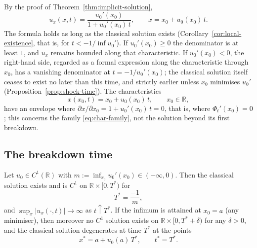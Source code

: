 By the proof of Theorem~\ref{thm:implicit-solution},
\begin{equation}
  \label{eq:ux-formula}
  u_x(x,t) = \frac{u_0'(x_0)}{1 + u_0'(x_0)\, t}, \qquad x = x_0 + u_0(x_0)\, t.
\end{equation}
The formula holds as long as the classical solution exists
(Corollary~\ref{cor:local-existence}, that is, for $t<-1/\inf u_0'$). If
$u_0'(x_0) \geq 0$ the denominator is at least $1$, and $u_x$ remains bounded
along that characteristic. If $u_0'(x_0) < 0$, the right-hand side, regarded as
a formal expression along the characteristic through $x_0$, has a vanishing
denominator at $t = -1/u_0'(x_0)$; the classical solution itself ceases to exist
no later than this time, and strictly earlier unless $x_0$ minimises $u_0'$
(Proposition~\ref{prop:shock-time}). The characteristics
\begin{equation}
  \label{eq:char-family}
  x(x_0, t) = x_0 + u_0(x_0)\, t, \qquad x_0 \in \mathbb{R},
\end{equation}
have an envelope where $\partial x/\partial x_0 = 1 + u_0'(x_0)\,t = 0$, that
is, where $\Phi_t'(x_0)=0$; this concerns the family \eqref{eq:char-family},
not the solution beyond its first breakdown.

\subsection{The breakdown time}
\label{subsec:shock-time}

\begin{proposition}
\label{prop:shock-time}
Let $u_0 \in C^1(\mathbb{R})$ with $m := \inf_{x_0} u_0'(x_0)\in(-\infty,0)$. Then
the classical solution exists and is $C^1$ on $\mathbb{R} \times [0,T^*)$ for
\begin{equation}
  \label{eq:shock-time}
  T^* = \frac{-1}{m},
\end{equation}
and $\sup_x|u_x(\cdot,t)|\to\infty$ as $t\uparrow T^*$. If the infimum is
attained at $x_0=a$ (any minimiser), then moreover no $C^1$ solution exists on
$\mathbb{R}\times[0,T^*+\delta)$ for any $\delta>0$, and the classical solution
degenerates at time $T^*$ at the points
\begin{equation}
  \label{eq:shock-location}
  x^* = a + u_0(a)\, T^*, \qquad t^* = T^*.
\end{equation}
\end{proposition}

